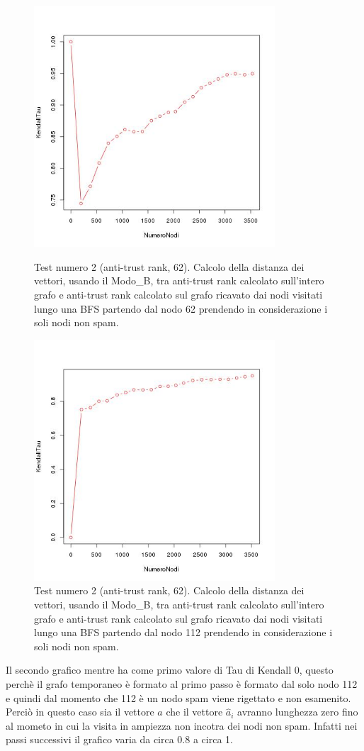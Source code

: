 \begin{figure}
\centering
 \includegraphics[height=9cm]{immagini/test2/antiTrustraktGoodNodesTestMode1_62}
 \caption{Test numero 2 (anti-trust rank, 62). Calcolo della distanza dei vettori, usando il Modo\_B, tra anti-trust rank calcolato sull'intero grafo e anti-trust rank calcolato sul grafo ricavato dai nodi visitati lungo una BFS partendo dal nodo 62 prendendo in considerazione i soli nodi non spam. }
 \label{fig:test2antitrustModoB62}
\centering
 \includegraphics[height=9cm]{immagini/test2/antiTrustraktGoodNodesTestMode1_112}
 \caption{Test numero 2 (anti-trust rank, 62). Calcolo della distanza dei vettori, usando il Modo\_B, tra anti-trust rank calcolato sull'intero grafo e anti-trust rank calcolato sul grafo ricavato dai nodi visitati lungo una BFS partendo dal nodo 112 prendendo in considerazione i soli nodi non spam. }
 \label{fig:test2antitrustModoB112}
\end{figure}
Il secondo grafico mentre ha come primo valore di Tau di Kendall 0, questo perchè il grafo temporaneo è formato al primo passo è formato dal solo nodo 112 e quindi dal momento che 112 è un nodo spam viene rigettato e non esamenito. Perciò in questo caso sia il vettore \(a\) che il vettore \(\hat{a}_i\) avranno lunghezza zero fino al mometo in cui la visita in ampiezza non incotra dei nodi non spam. Infatti nei passi successivi il grafico varia da circa 0.8 a circa 1.

